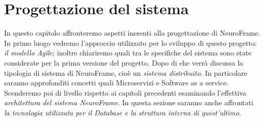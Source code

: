 \chapter{Progettazione del sistema}
In questo capitolo affronteremo aspetti inerenti alla progettazione di NeuroFrame.\newline
In primo luogo vedremo l'approccio utilizzato per lo sviluppo di questo progetto: \emph{il modello Agile}; inoltre chiariremo quali tra le specifiche del sistema sono state considerate per la prima versione del progetto.\newline
Dopo di che verrà discussa la tipologia di sistema di NeuroFrame, cioè un \emph{sistema distribuito}. In particolare saranno approfonditi concetti quali Microservizi e Software as a service.\newline
Scenderemo poi di livello rispetto ai capitoli precedenti esaminando l'effettiva \emph{architettura del sistema NeuroFrame}. In questa sezione saranno anche affrontati \emph{la tecnologia utilizzata per il Database e la struttura interna di quest'ultimo.}

